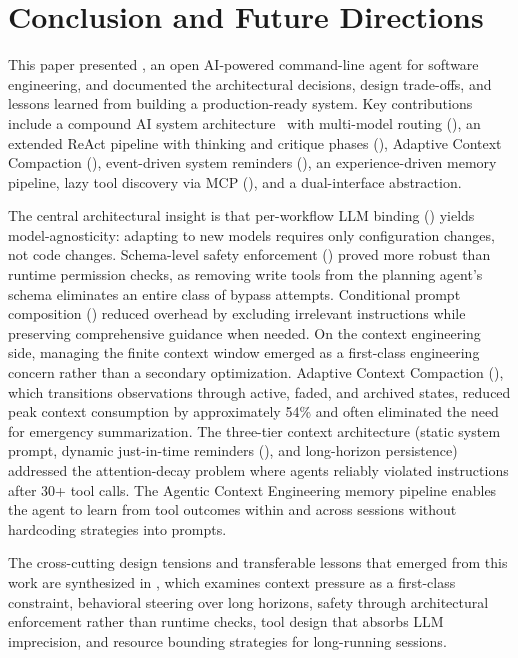 \section{Conclusion and Future Directions}
\label{sec:conclusion}

This paper presented \name, an open AI-powered command-line agent for software engineering, and documented the architectural decisions, design trade-offs, and lessons learned from building a production-ready system. Key contributions include a compound AI system architecture~\cite{zaharia2024compound} with multi-model routing (), an extended ReAct pipeline with thinking and critique phases (), Adaptive Context Compaction (), event-driven system reminders (), an experience-driven memory pipeline, lazy tool discovery via MCP (), and a dual-interface abstraction.

The central architectural insight is that per-workflow LLM binding () yields model-agnosticity: adapting to new models requires only configuration changes, not code changes. Schema-level safety enforcement () proved more robust than runtime permission checks, as removing write tools from the planning agent's schema eliminates an entire class of bypass attempts. Conditional prompt composition () reduced overhead by excluding irrelevant instructions while preserving comprehensive guidance when needed. On the context engineering side, managing the finite context window emerged as a first-class engineering concern rather than a secondary optimization. Adaptive Context Compaction (), which transitions observations through active, faded, and archived states, reduced peak context consumption by approximately 54\% and often eliminated the need for emergency summarization. The three-tier context architecture (static system prompt, dynamic just-in-time reminders (), and long-horizon persistence) addressed the attention-decay problem where agents reliably violated instructions after 30+ tool calls. The Agentic Context Engineering memory pipeline enables the agent to learn from tool outcomes within and across sessions without hardcoding strategies into prompts.

The cross-cutting design tensions and transferable lessons that emerged from this work are synthesized in , which examines context pressure as a first-class constraint, behavioral steering over long horizons, safety through architectural enforcement rather than runtime checks, tool design that absorbs LLM imprecision, and resource bounding strategies for long-running sessions.

